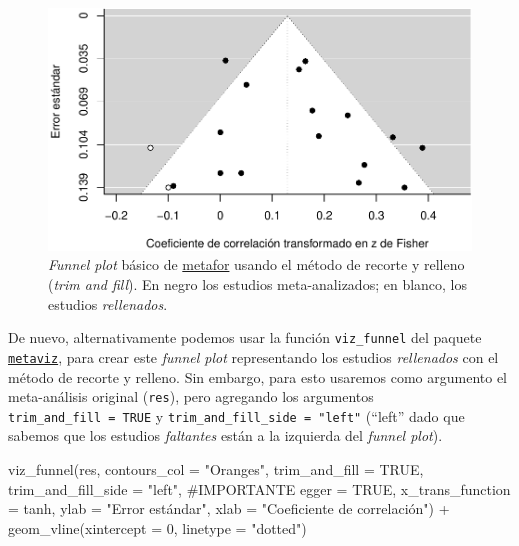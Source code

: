 \documentclass[
  bookmarksnumbered]{article}
\newenvironment{Shaded}{\begin{snugshade}}{\end{snugshade}}
\newcommand{\AttributeTok}[1]{\textcolor[rgb]{0.00,0.34,0.68}{#1}}
\newcommand{\CommentTok}[1]{\textcolor[rgb]{0.54,0.53,0.53}{#1}}
\newcommand{\ConstantTok}[1]{\textcolor[rgb]{0.67,0.33,0.00}{#1}}
\newcommand{\DecValTok}[1]{\textcolor[rgb]{0.69,0.50,0.00}{#1}}
\newcommand{\FunctionTok}[1]{\textcolor[rgb]{0.39,0.29,0.61}{#1}}
\newcommand{\NormalTok}[1]{\textcolor[rgb]{0.12,0.11,0.11}{#1}}
\newcommand{\SpecialCharTok}[1]{\textcolor[rgb]{0.24,0.68,0.91}{#1}}
\newcommand{\StringTok}[1]{\textcolor[rgb]{0.75,0.01,0.01}{#1}}
\begin{document}
\begin{figure}
\centering
\includegraphics{Meta-analysis_files/figure-latex/tf-plot1-1.pdf}
\caption{\label{fig:tf-plot1}\emph{Funnel plot} básico de \href{https://www.metafor-project.org/doku.php}{metafor} usando el método de recorte y relleno (\emph{trim and fill}). En negro los estudios meta-analizados; en blanco, los estudios \emph{rellenados}.}
\end{figure}

De nuevo, alternativamente podemos usar la función \texttt{viz\_funnel} del paquete \href{https://cran.r-project.org/web/packages/metaviz/vignettes/metaviz.html}{\texttt{metaviz}}, para crear este \emph{funnel plot} representando los estudios \emph{rellenados} con el método de recorte y relleno. Sin embargo, para esto usaremos como argumento el meta-análisis original (\texttt{res}), pero agregando los argumentos \texttt{trim\_and\_fill\ =\ TRUE} y \texttt{trim\_and\_fill\_side\ =\ "left"} (``left'' dado que sabemos que los estudios \emph{faltantes} están a la izquierda del \emph{funnel plot}).

\begin{Shaded}
\begin{Highlighting}[]
\FunctionTok{viz\_funnel}\NormalTok{(res, }
           \AttributeTok{contours\_col =} \StringTok{"Oranges"}\NormalTok{,}
           \AttributeTok{trim\_and\_fill =} \ConstantTok{TRUE}\NormalTok{, }
           \AttributeTok{trim\_and\_fill\_side =} \StringTok{"left"}\NormalTok{, }\CommentTok{\#IMPORTANTE}
           \AttributeTok{egger =} \ConstantTok{TRUE}\NormalTok{,}
           \AttributeTok{x\_trans\_function =}\NormalTok{ tanh,}
           \AttributeTok{ylab =} \StringTok{"Error estándar"}\NormalTok{,}
           \AttributeTok{xlab =} \StringTok{"Coeficiente de correlación"}\NormalTok{) }\SpecialCharTok{+}
  \FunctionTok{geom\_vline}\NormalTok{(}\AttributeTok{xintercept =} \DecValTok{0}\NormalTok{, }\AttributeTok{linetype =} \StringTok{"dotted"}\NormalTok{)}
\end{Highlighting}
\end{Shaded}
\end{document}
